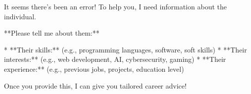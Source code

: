 It seems there's been an error! To help you, I need information about the individual.

**Please tell me about them:**

*   **Their skills:** (e.g., programming languages, software, soft skills)
*   **Their interests:** (e.g., web development, AI, cybersecurity, gaming)
*   **Their experience:** (e.g., previous jobs, projects, education level)

Once you provide this, I can give you tailored career advice!
